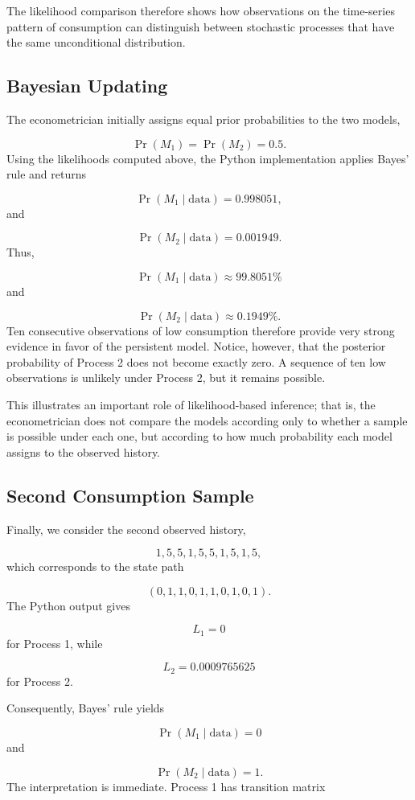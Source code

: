 \documentclass[11pt]{article}
\begin{document}
The likelihood comparison therefore shows how observations on the time-series
pattern of consumption can distinguish between stochastic processes that have
the same unconditional distribution.

\subsection*{Bayesian Updating}

The econometrician initially assigns equal prior probabilities to the two models,

\[
\Pr(M_1)=\Pr(M_2)=0.5.
\]
Using the likelihoods computed above, the Python implementation applies Bayes'
rule and returns

\[
\Pr(M_1\mid \text{data})=0.998051,
\]
and

\[
\Pr(M_2\mid \text{data})=0.001949.
\]
Thus,

\[
\boxed{
\Pr(M_1\mid \text{data})\approx 99.8051\%
}
\]
and

\[
\boxed{
\Pr(M_2\mid \text{data})\approx 0.1949\%
}.
\]
Ten consecutive observations of low consumption therefore provide very strong
evidence in favor of the persistent model. Notice, however, that the posterior
probability of Process 2 does not become exactly zero. A sequence of ten low
observations is unlikely under Process 2, but it remains possible.

This illustrates an important role of likelihood-based inference; that is, the
econometrician does not compare the models according only to whether a sample
is possible under each one, but according to how much probability each model
assigns to the observed history.

\subsection*{Second Consumption Sample}

Finally, we consider the second observed history,

\[
1,5,5,1,5,5,1,5,1,5,
\]
which corresponds to the state path

\[
(0,1,1,0,1,1,0,1,0,1).
\]
The Python output gives

\[
L_1=0
\]
for Process 1, while

\[
L_2=0.0009765625
\]
for Process 2.

Consequently, Bayes' rule yields

\[
\boxed{
\Pr(M_1\mid\text{data})=0
}
\]
and

\[
\boxed{
\Pr(M_2\mid\text{data})=1
}.
\]
The interpretation is immediate. Process 1 has transition matrix
\end{document}
